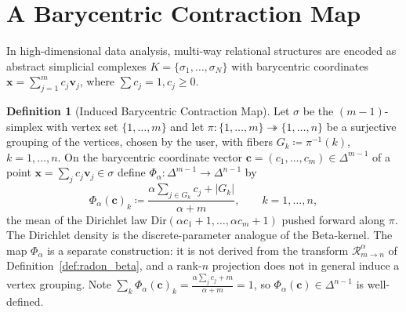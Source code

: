 \documentclass[11pt,a4paper]{article}
\theoremstyle{plain}
\theoremstyle{definition}
\newtheorem{definition}[theorem]{Definition}
\theoremstyle{remark}
\numberwithin{equation}{section}
\begin{document}
\section{A Barycentric Contraction Map}

In high-dimensional data analysis, multi-way relational structures are encoded as abstract simplicial complexes $K = \{\sigma_1, \dots, \sigma_N\}$ with barycentric coordinates $\mathbf{x} = \sum_{j=1}^m c_j \mathbf{v}_j$, where $\sum c_j = 1, c_j \ge 0$.

\begin{definition}[Induced Barycentric Contraction Map]
\label{def:induced_barycentric_map}
Let $\sigma$ be the $(m-1)$-simplex with vertex set $\{1,\dots,m\}$ and let $\pi : \{1,\dots,m\} \twoheadrightarrow \{1,\dots,n\}$ be a surjective grouping of the vertices, chosen by the user, with fibers $G_k \coloneqq \pi^{-1}(k)$, $k=1,\dots,n$. On the barycentric coordinate vector $\mathbf{c} = (c_1,\dots,c_m) \in \Delta^{m-1}$ of a point $\mathbf{x} = \sum_j c_j \mathbf{v}_j \in \sigma$ define $\Phi_\alpha : \Delta^{m-1} \to \Delta^{n-1}$ by
\begin{equation}
\label{eq:induced_map}
\Phi_\alpha(\mathbf{c})_k \coloneqq \frac{\alpha \sum_{j \in G_k} c_j + |G_k|}{\alpha + m}, \qquad k = 1, \dots, n,
\end{equation}
the mean of the Dirichlet law $\mathrm{Dir}(\alpha c_1 + 1, \dots, \alpha c_m + 1)$ pushed forward along $\pi$. The Dirichlet density is the discrete-parameter analogue of the Beta-kernel. The map $\Phi_\alpha$ is a separate construction: it is not derived from the transform $\mathcal{R}_{m\to n}^\alpha$ of Definition~\ref{def:radon_beta}, and a rank-$n$ projection does not in general induce a vertex grouping. Note $\sum_k \Phi_\alpha(\mathbf{c})_k = \frac{\alpha \sum_j c_j + m}{\alpha+m} = 1$, so $\Phi_\alpha(\mathbf{c}) \in \Delta^{n-1}$ is well-defined.
\end{definition}
\end{document}
